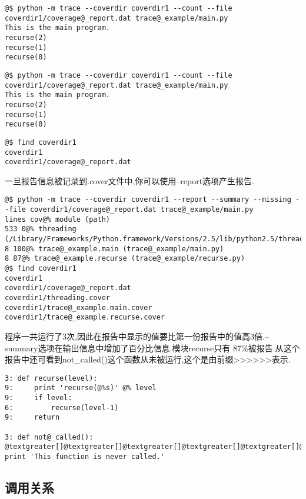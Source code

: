 \documentclass[a4paper,10pt,english]{manual}
\begin{document}
\begin{Verbatim}[commandchars=@\[\]]
@$ python -m trace --coverdir coverdir1 --count --file coverdir1/coverage@_report.dat trace@_example/main.py
This is the main program.
recurse(2)
recurse(1)
recurse(0)
\end{Verbatim}

\begin{Verbatim}[commandchars=@\[\]]
@$ python -m trace --coverdir coverdir1 --count --file coverdir1/coverage@_report.dat trace@_example/main.py
This is the main program.
recurse(2)
recurse(1)
recurse(0)
\end{Verbatim}

\begin{Verbatim}[commandchars=@\[\]]
@$ find coverdir1
coverdir1
coverdir1/coverage@_report.dat
\end{Verbatim}

一旦报告信息被记录到.cover文件中,你可以使用--report选项产生报告.

\begin{Verbatim}[commandchars=@\[\]]
@$ python -m trace --coverdir coverdir1 --report --summary --missing --file coverdir1/coverage@_report.dat trace@_example/main.py
lines cov@% module (path)
533 0@% threading (/Library/Frameworks/Python.framework/Versions/2.5/lib/python2.5/threading.py)
8 100@% trace@_example.main (trace@_example/main.py)
8 87@% trace@_example.recurse (trace@_example/recurse.py)
@$ find coverdir1
coverdir1
coverdir1/coverage@_report.dat
coverdir1/threading.cover
coverdir1/trace@_example.main.cover
coverdir1/trace@_example.recurse.cover
\end{Verbatim}

程序一共运行了3次,因此在报告中显示的值要比第一份报告中的值高3倍.--summary选项在输出信息中增加了百分比信息.模块recurse只有 87\%被报告.从这个报告中还可看到not\_called()这个函数从未被运行,这个是由前缀\textgreater{}\textgreater{}\textgreater{}\textgreater{}\textgreater{}\textgreater{}表示.

\begin{Verbatim}[commandchars=@\[\]]
3: def recurse(level):
9:     print 'recurse(@%s)' @% level
9:     if level:
6:         recurse(level-1)
9:     return

3: def not@_called():
@textgreater[]@textgreater[]@textgreater[]@textgreater[]@textgreater[]@textgreater[] print 'This function is never called.'
\end{Verbatim}


\subsection{调用关系}
\end{document}
